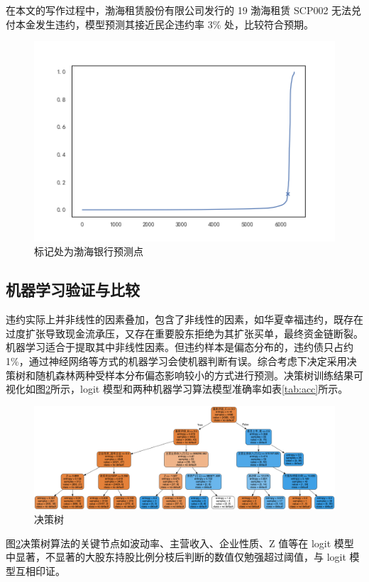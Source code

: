 在本文的写作过程中，渤海租赁股份有限公司发行的 19 渤海租赁 SCP002 无法兑付本金发生违约，模型预测其接近民企违约率 3\% 处，比较符合预期。
\begin{figure}[h]
	\centering
	\includegraphics[width=0.9\linewidth]{./data/渤海银行.png}
	\caption{标记处为渤海银行预测点}
	\label{fig:bhyh}
\end{figure}

\subsection{机器学习验证与比较}
违约实际上并非线性的因素叠加，包含了非线性的因素，如华夏幸福违约，既存在过度扩张导致现金流承压，又存在重要股东拒绝为其扩张买单，最终资金链断裂。机器学习适合于提取其中非线性因素。但违约样本是偏态分布的，违约债只占约 1\%，通过神经网络等方式的机器学习会使机器判断有误。综合考虑下决定采用决策树和随机森林两种受样本分布偏态影响较小的方式进行预测。决策树训练结果可视化如图\ref{fig:decision_tree}所示，logit 模型和两种机器学习算法模型准确率如表\ref{tab:acc}所示。


\begin{figure}
	\centering
	\includegraphics[width=.9\linewidth]{./data/decision_tree.png}
	\caption{\label{fig:decision_tree}决策树}
\end{figure}

图\ref{fig:decision_tree}决策树算法的关键节点如波动率、主营收入、企业性质、Z 值等在 logit 模型中显著，不显著的大股东持股比例分枝后判断的数值仅勉强超过阈值，与 logit 模型互相印证。

